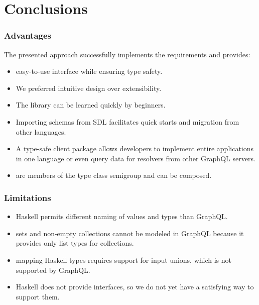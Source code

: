\section{Conclusions}

\begin{frame}\frametitle{Advantages}

The presented approach successfully implements the requirements and provides:

\begin{itemize}
    \item easy-to-use interface while ensuring type safety.
    \item We preferred intuitive design over extensibility.
    \item The library can be learned quickly by beginners.
    \item Importing schemas from SDL facilitates quick starts and migration from other languages.
    \item A type-safe client package allows developers to implement entire applications in one language or even query data for resolvers from other GraphQL servers.
    \item {} are members of the type class semigroup and can be composed.
\end{itemize}

\end{frame}

\begin{frame}\frametitle{Limitations}

\begin{itemize}
    \item Haskell permits different naming of values and types than GraphQL. 
    \item sets and non-empty collections cannot be modeled in GraphQL because it provides only list types for collections. 
    \item mapping Haskell types requires support for input unions, which is not supported by GraphQL. 
    \item Haskell does not provide interfaces, so we do not yet have a satisfying way to support them. 
\end{itemize}

\end{frame}

